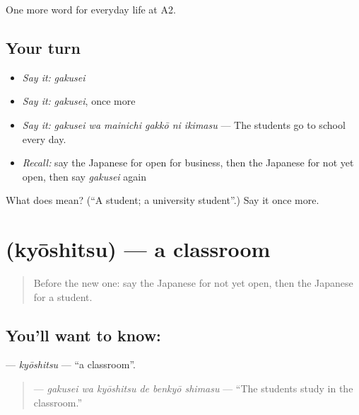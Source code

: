 \begin{grammarlens}[title={What you've built}]
One more word for everyday life at A2.
\end{grammarlens}

\subsection*{Your turn}
\begin{itemize}
\raggedright
  \item \emph{Say it:} \emph{gakusei}
  \item \emph{Say it:} \emph{gakusei}, once more
  \item \emph{Say it:} \emph{gakusei wa mainichi gakkō ni ikimasu} — The students go to school every day.
  \item \emph{Recall:} say the Japanese for open for business, then the Japanese for not yet open, then say \emph{gakusei} again
\end{itemize}

\begin{tcolorbox}[breakable,colback=teal!4,colframe=teal!35!black,title={Before you move on}]
What does  mean? (\textquotedblleft{}A student; a university student\textquotedblright{}.) Say it once more.
\end{tcolorbox}
\section[\texorpdfstring{\ja{きょうしつ} (kyōshitsu)}{きょうしつ (kyōshitsu)}]{ (kyōshitsu) — a classroom}

\label{lesson:JA-C224-kyoushitsu}



\begin{quote}
Before the new one: say the Japanese for not yet open, then the Japanese for a student.
\end{quote}

\subsection*{You'll want to know: }
\textbf{} — \emph{kyōshitsu} — \textquotedblleft{}a classroom\textquotedblright{}.

\begin{quote}
\textbf{  } — \emph{gakusei wa kyōshitsu de benkyō shimasu} — \textquotedblleft{}The students study in the classroom.\textquotedblright{}
\end{quote}

